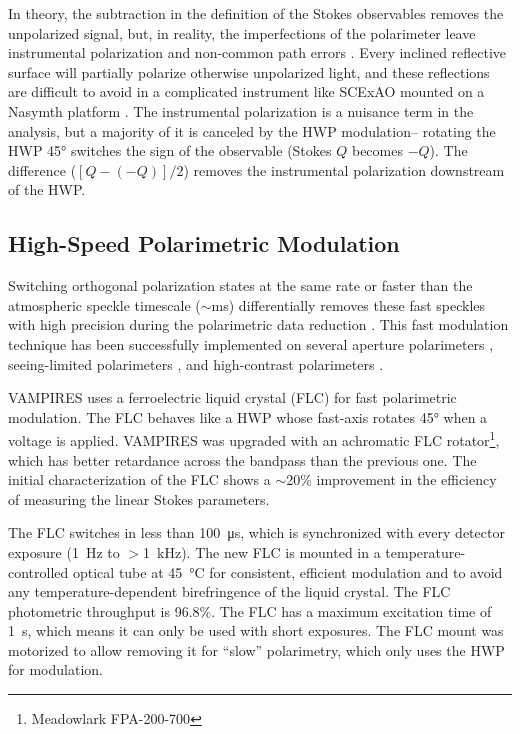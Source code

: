 In theory, the subtraction in the definition of the Stokes observables removes the unpolarized signal, but, in reality, the imperfections of the polarimeter leave instrumental polarization and non-common path errors \citep{kuhn_imaging_2001,tinbergen_astronomical_2005}. Every inclined reflective surface will partially polarize otherwise unpolarized light, and these reflections are difficult to avoid in a complicated instrument like SCExAO mounted on a Nasymth platform \citep{tinbergen_accurate_2007}. The instrumental polarization is a nuisance term in the analysis, but a majority of it is canceled by the HWP modulation-- rotating the HWP \ang{45} switches the sign of the observable (Stokes $Q$ becomes $-Q$). The difference ($[Q - (-Q)]/2$) removes the instrumental polarization downstream of the HWP.

\subsection{High-Speed Polarimetric Modulation}

Switching orthogonal polarization states at the same rate or faster than the atmospheric speckle timescale ($\sim$\si{\milli\second}) differentially removes these fast speckles with high precision during the polarimetric data reduction \citep{kemp_piezo-optical_1969}. This fast modulation technique has been successfully implemented on several aperture polarimeters \citep{rodenhuis_extreme_2012,harrington_innopol_2014,bailey_high-sensitivity_2015,bailey_high-precision_2017,bailey_hippi-2_2020}, seeing-limited polarimeters \citep{safonov_speckle_2017,bailey_picsarr_2023}, and high-contrast polarimeters \citep{norris_vampires_2015,schmid_spherezimpol_2018}. 

VAMPIRES uses a ferroelectric liquid crystal (FLC) for fast polarimetric modulation. The FLC behaves like a HWP whose fast-axis rotates \ang{45} when a voltage is applied. VAMPIRES was upgraded with an achromatic FLC rotator\footnote{Meadowlark FPA-200-700}, which has better retardance across the bandpass than the previous one. The initial characterization of the FLC shows a $\sim$20\% improvement in the efficiency of measuring the linear Stokes parameters.

The FLC switches in less than \SI{100}{\micro\second}, which is synchronized with every detector exposure (\SI{1}{\hertz} to $>$\SI{1}{\kilo\hertz}). The new FLC is mounted in a temperature-controlled optical tube at \SI{45}{\celsius} for consistent, efficient modulation and to avoid any temperature-dependent birefringence of the liquid crystal. The FLC photometric throughput is 96.8\%. The FLC has a maximum excitation time of \SI{1}{\second}, which means it can only be used with short exposures. The FLC mount was motorized to allow removing it for ``slow'' polarimetry, which only uses the HWP for modulation.


